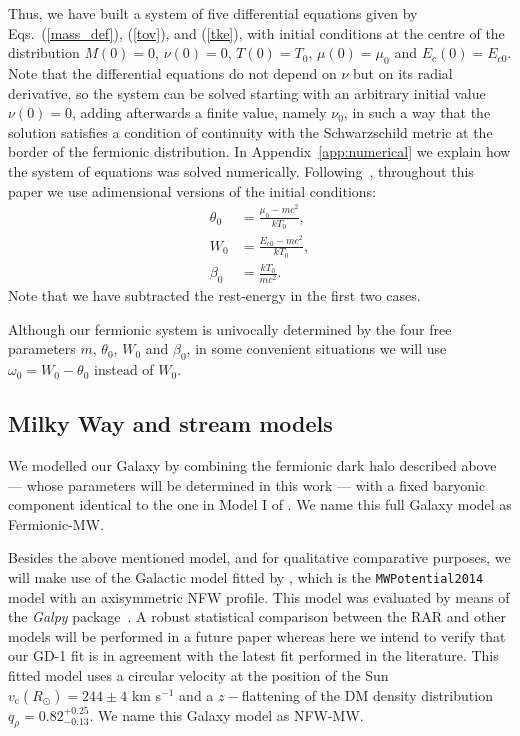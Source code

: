 \documentclass[twocolumn]{aa}
\begin{document}
Thus, we have built a system of five differential equations given
by Eqs.~(\ref{mass_def}), (\ref{tov}), and (\ref{tke}), with initial conditions
at the centre of the distribution $M(0)=0$, $\nu(0)=0$, $T(0)=T_0$,
$\mu(0)=\mu_0$ and $E_c(0)=E_{c0}$.
Note that the differential equations do not depend on $\nu$ but on its radial
derivative, so the system can be solved starting with an arbitrary initial value $\nu(0)=0$, adding afterwards a finite value, namely $\nu_0$, in such a way that the solution satisfies a condition of continuity with the Schwarzschild metric at the border of the fermionic distribution. In Appendix~\ref{app:numerical} we explain how the system of equations was solved numerically. Following~\cite{arguelles_novel_2018}, throughout this paper we use adimensional versions of the initial conditions:
\begin{align}
    \theta_0 &= \frac{\mu_0 - mc^2}{kT_0},\nonumber\\
    W_0 &= \frac{E_{c0} - mc^2}{kT_0},\nonumber\\
    \beta_0 &= \frac{kT_0}{mc^2}.\label{rar_params}
\end{align}
Note that we have subtracted the rest-energy in the first two cases.

Although our fermionic system is univocally determined by the four free parameters $m$, $\theta_0$, $W_0$ and $\beta_0$, in some convenient situations we will use $\omega_0=W_0-\theta_0$ instead of $W_0$.




\subsection{Milky Way and stream models}
\label{sec:MW_stream_models}

We modelled our Galaxy by combining the fermionic dark halo described above --- whose parameters will be determined in this work --- with a fixed baryonic component identical to the one in Model I of \citet{2017A&A...598A..66P}. We name this full Galaxy model as Fermionic-MW.

Besides the above mentioned model, and for qualitative comparative purposes, we will make use of the Galactic model fitted by \citet{2019MNRAS.486.2995M}, which is the {\texttt{MWPotential2014}} model with an axisymmetric NFW profile. This model was evaluated by means of the {\it Galpy} package~\citep{2015ApJS..216...29B}. A robust statistical comparison between the RAR and other models will be performed in a future paper whereas here we intend to verify that our GD-1 fit is in agreement with the latest fit performed in the literature. This fitted model uses a circular velocity at the position of the Sun $v_\mathrm{c}(R_\odot)=244 \pm 4$ km s$^{-1}$ and a $z-$flattening of the DM density distribution  $q_\rho=0.82^{+0.25}_{-0.13}$. We name this Galaxy model as NFW-MW.
\end{document}
